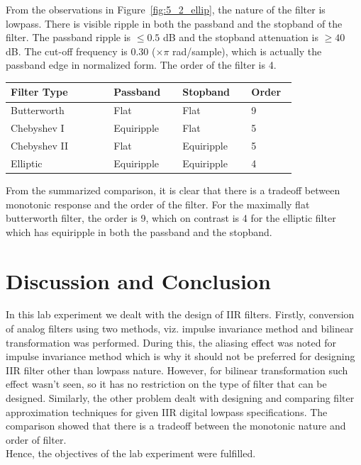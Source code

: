 \documentclass{lab_sheet}
\begin{document}
From the observations in Figure~\ref{fig:5_2_ellip}, the nature of the filter is lowpass. There is visible ripple in both the passband and the stopband of the filter. The passband ripple is $\leq0.5$ dB and the stopband attenuation is $\geq40$ dB. The cut-off frequency is 0.30 ($\times \pi$ rad/sample), which is actually the passband edge in normalized form. The order of the filter is 4. 
\begin{table}[H]
    \centering
    \begin{tabular}{|m{0.3\linewidth}||m{0.2\linewidth}||m{0.2\linewidth}||m{0.1\linewidth}|}
        \hline
        \textbf{Filter Type}&\textbf{Passband}&\textbf{Stopband}&\textbf{Order}\\\hline\hline
        Butterworth&Flat&Flat&9\\\hline
        Chebyshev I&Equiripple&Flat&5\\\hline
        Chebyshev II&Flat&Equiripple&5\\\hline
        Elliptic&Equiripple&Equiripple&4\\\hline
    \end{tabular}
\end{table}
From the summarized comparison, it is clear that there is a tradeoff between monotonic response and the order of the filter. For the maximally flat butterworth filter, the order is 9, which on contrast is 4 for the elliptic filter which has equiripple in both the passband and the stopband.
\section{Discussion and Conclusion}
In this lab experiment we dealt with the design of IIR filters. Firstly, conversion of analog filters using two methods, viz. impulse invariance method and bilinear transformation was performed. During this, the aliasing effect was noted for impulse invariance method which is why it should not be preferred for designing IIR filter other than lowpass nature. However, for bilinear transformation such effect wasn't seen, so it has no restriction on the type of filter that can be designed. Similarly, the other problem dealt with designing and comparing filter approximation techniques for given IIR digital lowpass specifications. The comparison showed that there is a tradeoff between the monotonic nature and order of filter. \\
Hence, the objectives of the lab experiment were fulfilled.
\end{document}
